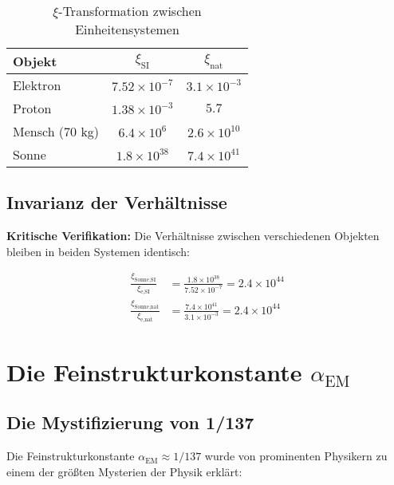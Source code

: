 \documentclass[12pt,a4paper]{article}
\newcommand{\xipar}{\xi}
\begin{document}
	\begin{table}[htbp]
		\centering
		\begin{tabular}{lcc}
			\toprule
			\textbf{Objekt} & \textbf{$\xipar_{\text{SI}}$} & \textbf{$\xipar_{\text{nat}}$} \\
			\midrule
			Elektron & $7.52 \times 10^{-7}$ & $3.1 \times 10^{-3}$ \\
			Proton & $1.38 \times 10^{-3}$ & $5.7$ \\
			Mensch (70 kg) & $6.4 \times 10^{6}$ & $2.6 \times 10^{10}$ \\
			Sonne & $1.8 \times 10^{38}$ & $7.4 \times 10^{41}$ \\
			\bottomrule
		\end{tabular}
		\caption{$\xipar$-Transformation zwischen Einheitensystemen}
		\label{tab:xi_transformation}
	\end{table}
	
	\subsection{Invarianz der Verhältnisse}
	\label{subsec:xi_verhaeltnis_invarianz}
	
	\textbf{Kritische Verifikation:} Die Verhältnisse zwischen verschiedenen Objekten bleiben in beiden Systemen identisch:
	
	\begin{align}
		\frac{\xipar_{\text{Sonne},\text{SI}}}{\xipar_{\text{e},\text{SI}}} &= \frac{1.8 \times 10^{38}}{7.52 \times 10^{-7}} = 2.4 \times 10^{44} \\
		\frac{\xipar_{\text{Sonne},\text{nat}}}{\xipar_{\text{e},\text{nat}}} &= \frac{7.4 \times 10^{41}}{3.1 \times 10^{-3}} = 2.4 \times 10^{44}
	\end{align}
	
	
\section{Die Feinstrukturkonstante $\alpha_{\text{EM}}$}
\label{sec:alpha_em}

\subsection{Die Mystifizierung von 1/137}
\label{subsec:alpha_mystification}

Die Feinstrukturkonstante $\alpha_{\text{EM}} \approx 1/137$ wurde von prominenten Physikern zu einem der größten Mysterien der Physik erklärt:
\end{document}
